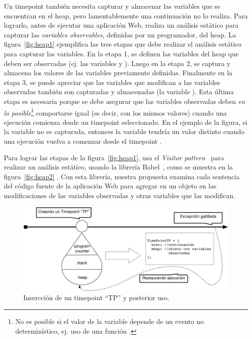 \documentclass[conference]{IEEEtran}
\begin{document}
Un timepoint tambi\'en necesita capturar y almacenar las variables que se encuentran en el heap, pero lamentablemente una continuaci\'on no lo realiza. Para lograrlo, antes de ejecutar una aplicaci\'on Web, \deloreanjs realiza un an\'alisis est\'atico para capturar las {\em variables observables}, definidas por un programador, del heap. La figura~\ref{fig:heap1} ejemplifica las tres etapas que debe realizar el an\'alisis est\'atico para capturar las variables. En la etapa 1, se definen las variables del heap que deben ser observadas (ej. las variables  y ). Luego en la etapa 2, se captura y almacena los valores de las variables previamente definidas. Finalmente en la etapa 3, se puede apreciar que las variables que modifican a las variables observadas tambi\'en son capturadas y almacenadas (la variable ). Esta \'ultima etapa es necesaria porque se debe asegurar que las variables observadas deben {\em en lo posible}\footnote{No es posible si el valor de la variable depende de un evento no determin\'istico, ej. uso de una funci\'on .} comportarse igual (es decir, con los mismos valores) cuando una ejecuci\'on comienza desde un timepoint seleccionado. En el ejemplo de la figura, si la variable  no es capturada, entonces la variable  tendr\'ia un valor distinto cuando una ejecuci\'on vuelva a comenzar desde el timepoint .          

Para lograr las etapas de la figura~\ref{fig:heap1}, \deloreanjs usa el {\em Visitor pattern}~\cite{GoF94} para realizar un an\'alisis est\'atico, usando la librer\'ia Babel~\cite{mckenzie:babel}, como se muestra en la figura~\ref{fig:heap2} . Con esta librer\'ia, nuestra propuesta examina cada sentencia del c\'odigo fuente de la aplicaci\'on Web para agregar en un objeto en \javascript las modificaciones de las variables observadas y otras variables que las modifican.

\begin{figure}[t]
\begin{center}
\includegraphics[width=1.05\linewidth]{fig-timePointTP}
\caption{Insercci\'on de un timepoint ``TP'' y posterior uso.}
\label{fig:tpA}
\end{center}
\end{figure}
\end{document}
